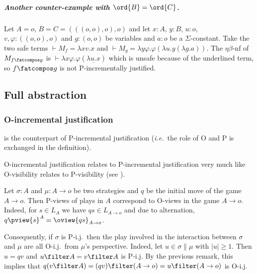 \subparagraph{Another counter-example with $\ord{B} = \ord{C}$.}

Let $A=o$, $B=C=(((o,o),o),o)$ and let $x:A$, $y:B$, $u:o$, $v,\varphi:((o,o),o)$
and $g:(o,o)$ be variables and  $a:o$ be a $\Sigma$-constant. Take the two safe terms $\vdash  M_f = \lambda x v.x$ and $\vdash M_g = \lambda y \varphi. \varphi (\lambda u . y (\lambda g. a))$.
The $\eta\beta$-nf of $M_{f\fatcompos g}$ is $\vdash \lambda x \varphi. \varphi (\underline{\lambda u . x})$ which is unsafe because of the underlined term, so
$f\fatcompos g$ is not P-incrementally justified.

\subsection{Full abstraction}


\subsubsection{O-incremental justification}

 is the counterpart of P-incremental justification ({\it i.e.}~the role of O and P is exchanged in the definition).

O-incremental justification relates to P-incremental justification very much like O-visibility relates to P-visibility
(see \cite[Sec.~3.6]{Harmer2005}).

Let $\sigma : A$ and $\mu : A \rightarrow o$ be two strategies and $q$ be the initial move of the game $A \rightarrow o$. Then P-views of plays in $A$ correspond to O-views
in the game $A \rightarrow o$. Indeed, for $s\in L_A$ we have $q s \in L_{A \rightarrow o}$ and
due to alternation, $q \pview{s}^A = \oview{q s }_{A \rightarrow o}$.

Consequently, if $\sigma$ is P-i.j.\ then the play involved in the interaction between $\sigma$ and $\mu$
are all O-i.j.\ from $\mu$'s perspective. Indeed, let $u \in \sigma \| \mu$ with $|u|\geq1$. Then $u=q v$
and $u\filter A = v \filter A$ is P-i.j. By the previous remark, this implies that $q (v\filter A) = (q v)\filter (A \rightarrow o) = u \filter (A \rightarrow o)$ is O-i.j.
\smallskip

